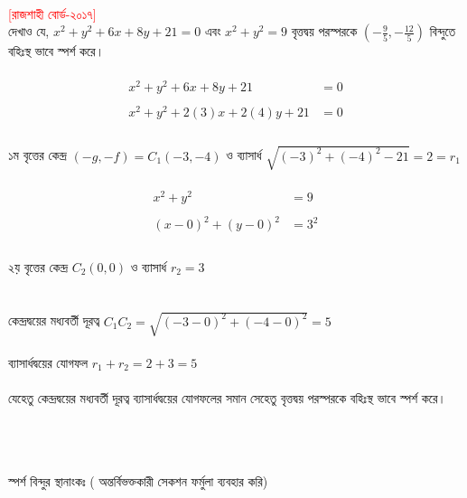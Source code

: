 \documentclass{article}
\begin{document}
\\
	\textcolor{red}{[রাজশাহী বোর্ড-২০১৭]}\\ 
দেখাও যে, $x^2+y^2+6x+8y+21=0$ এবং  $x^2+y^2=9$ বৃত্তদ্বয় পরস্পরকে  $\left(-\frac{9}{5},-\frac{12}{5}\right)$ বিন্দুতে বহিঃস্থ ভাবে স্পর্শ করে। \\
\\ 
\begin{align*}
x^2+y^2+6x+8y+21&=0\\
\\
x^2+y^2+2(3)x+2(4)y+21&=0\\
\end{align*}
\\ 
১ম বৃত্তের কেন্দ্র $(-g,-f)=C_1(-3,-4)$ ও ব্যাসার্ধ  $\sqrt{(-3)^2+(-4)^2-21}=2=r_1$\\
\\
\begin{align*}
x^2+y^2&=9\\ 
	\\
(x-0)^2+(y-0)^2&=3^2\\
\end{align*}
\\ 
২য় বৃত্তের কেন্দ্র $C_2(0,0)$ ও ব্যাসার্ধ  $r_2=3$\\
\\ 
\\ 
কেন্দ্রদ্বয়ের মধ্যবর্তী দূরত্ব  $C_1C_2=\sqrt{(-3-0)^2+(-4-0)^2}=5$\\ 
\\
ব্যাসার্ধদ্বয়ের যোগফল $r_1+r_2=2+3=5$\\
\\ 
যেহেতু কেন্দ্রদ্বয়ের মধ্যবর্তী দূরত্ব ব্যাসার্ধদ্বয়ের যোগফলের সমান সেহেতু বৃত্তদ্বয় পরস্পরকে বহিঃস্থ ভাবে স্পর্শ করে। \\
\\ 
\\
\\
স্পর্শ বিন্দুর স্থানাংকঃ ( অন্তর্বিভক্তকারী সেকশন ফর্মুলা ব্যবহার করি)\\ 
\\ 
\end{document}
